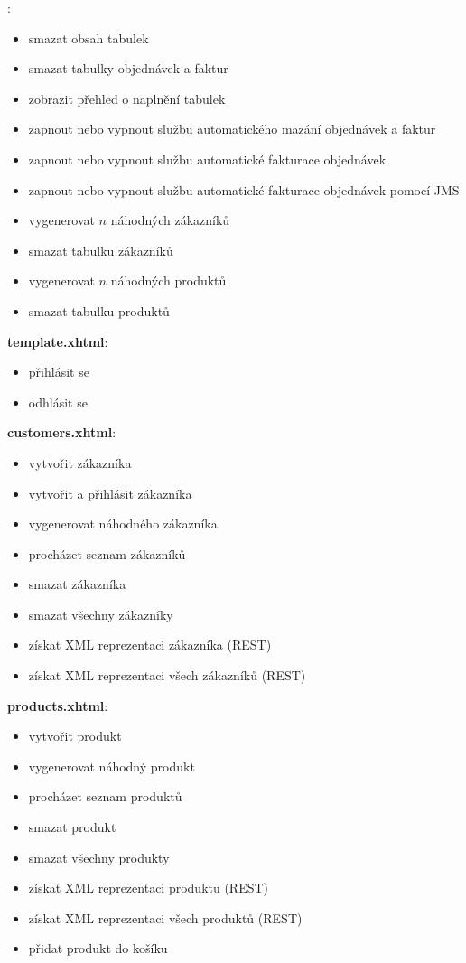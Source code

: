 \documentclass[122pt,oneside]{fithesis}
\begin{document}
:
\begin{itemize}  \itemsep0em
  \item smazat obsah tabulek
  \item smazat tabulky objednávek a faktur
  \item zobrazit přehled o naplnění tabulek
  \item zapnout nebo vypnout službu automatického mazání objednávek a faktur
  \item zapnout nebo vypnout službu automatické fakturace objednávek
  \item zapnout nebo vypnout službu automatické fakturace objednávek pomocí JMS
  \item vygenerovat $n$ náhodných zákazníků 
  \item smazat tabulku zákazníků
  \item vygenerovat $n$ náhodných produktů
  \item smazat tabulku produktů
\end{itemize}
{\bf template.xhtml}:
\begin{itemize}  \itemsep0em
  \item přihlásit se 
  \item odhlásit se
\end{itemize}
{\bf customers.xhtml}:
\begin{itemize}  \itemsep0em
  \item vytvořit zákazníka
  \item vytvořit a přihlásit zákazníka
  \item vygenerovat náhodného zákazníka
  \item procházet seznam zákazníků
  \item smazat zákazníka
  \item smazat všechny zákazníky
  \item získat XML reprezentaci zákazníka (REST)
  \item získat XML reprezentaci všech zákazníků (REST)
\end{itemize}
{\bf products.xhtml}:
\begin{itemize}  \itemsep0em
  \item vytvořit produkt
  \item vygenerovat náhodný produkt
  \item procházet seznam produktů
  \item smazat produkt
  \item smazat všechny produkty
  \item získat XML reprezentaci produktu (REST)
  \item získat XML reprezentaci všech produktů (REST)
  \item přidat produkt do košíku
\end{itemize}
\end{document}
